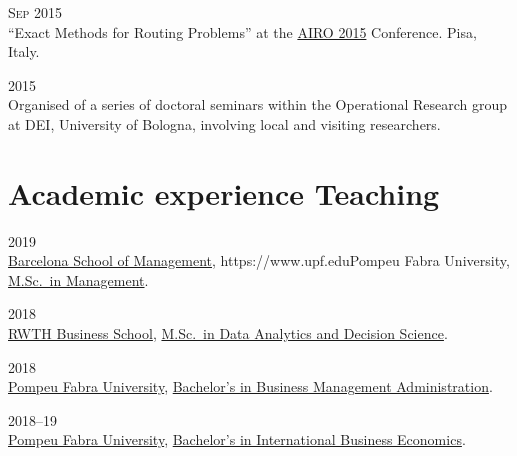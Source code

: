 \begin{paracol}{2}
  \textsc{Sep 2015}
\switchcolumn
  \\
  ``Exact Methods for Routing Problems'' at the \href{http://web.archive.org/web/20150924164917/http://www.airo.org/conferences/airo2015/}{AIRO 2015} Conference.
  Pisa, Italy.
\end{paracol}

\begin{paracol}{2}
  \textsc{2015}
\switchcolumn
  \\
  Organised of a series of doctoral seminars within the Operational Research group at DEI, University of Bologna, involving local and visiting researchers.
\end{paracol}

\section*{Academic experience {\small Teaching}}

\begin{paracol}{2}
  \textsc{2019}
\switchcolumn
  \\
  \href{https://www.barcelonaschoolofmanagement.upf.edu/en}{Barcelona School of Management}, {https://www.upf.edu}{Pompeu Fabra University}, \href{https://www.barcelonaschoolofmanagement.upf.edu/en/master-of-science-in-management-specialization-in-business-analytics/study-plan}{M.Sc.\ in Management}.
\end{paracol}

\begin{paracol}{2}
  \textsc{2018}
\switchcolumn
  \\
  \href{https://www.business-school.rwth-aachen.de/en/}{RWTH Business School}, \href{https://www.business-school.rwth-aachen.de/en/programs/degree-programs/mme-dds/overview}{M.Sc.\ in Data Analytics and Decision Science}.
\end{paracol}

\begin{paracol}{2}
  \textsc{2018}
\switchcolumn
  \\
  \href{https://www.upf.edu/}{Pompeu Fabra University}, \href{https://www.upf.edu/es/web/graus/grau-ade}{Bachelor's in Business Management Administration}.
\end{paracol}

\begin{paracol}{2}
  \textsc{2018--19}
\switchcolumn
  \\
  \href{https://www.upf.edu/}{Pompeu Fabra University}, \href{https://www.upf.edu/es/web/graus/grau-international-business-economics}{Bachelor's in International Business Economics}.
\end{paracol}

